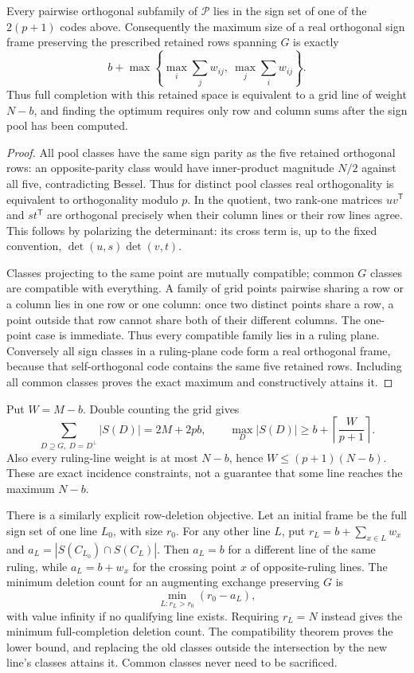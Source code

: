 \begin{theorem}
Every pairwise orthogonal subfamily of $\mathcal P$ lies in the
sign set of one of the $2(p+1)$ codes above. Consequently the maximum
size of a real orthogonal sign frame preserving the prescribed
retained rows spanning $G$ is exactly
\[
 \boxed{b+\max\left\{\max_i\sum_jw_{ij},\ \max_j\sum_iw_{ij}\right\}.}
\]
Thus full completion with this retained space is equivalent to a
grid line of weight $N-b$, and finding the optimum requires only
row and column sums after the sign pool has been computed.
\end{theorem}
\begin{proof}
All pool classes have the same sign parity as the five retained
orthogonal rows: an opposite-parity class would have inner-product
magnitude $N/2$ against all five, contradicting Bessel. Thus for
distinct pool classes real orthogonality is equivalent to orthogonality
modulo $p$. In the quotient, two rank-one matrices $uv^{\mathsf T}$
and $st^{\mathsf T}$ are orthogonal precisely when their column
lines or their row lines agree. This follows by polarizing the
determinant: its cross term is, up to the fixed convention,
$\det(u,s)\det(v,t)$.

Classes projecting to the same point are mutually compatible;
common $G$ classes are compatible with everything. A family of grid
points pairwise sharing a row or a column lies in one row or one
column: once two distinct points share a row, a point outside that
row cannot share both of their different columns. The one-point
case is immediate. Thus every compatible family lies in a ruling
plane. Conversely all sign classes in a ruling-plane code form
a real orthogonal frame, because that self-orthogonal code contains
the same five retained rows. Including all common classes proves
the exact maximum and constructively attains it.
\end{proof}

Put $W=M-b$. Double counting the grid gives
\[
 \sum_{D\supseteq G,\ D=D^\perp}|S(D)|=2M+2pb,
 \qquad
 \max_D|S(D)|\ge b+\left\lceil\frac{W}{p+1}\right\rceil.
\]
Also every ruling-line weight is at most $N-b$, hence
$W\le(p+1)(N-b)$. These are exact incidence constraints, not a
guarantee that some line reaches the maximum $N-b$.

There is a similarly explicit row-deletion objective. Let an initial
frame be the full sign set of one line $L_0$, with size $r_0$.
For any other line $L$, put $r_L=b+\sum_{x\in L}w_x$ and
$a_L=|S(C_{L_0})\cap S(C_L)|$. Then $a_L=b$ for a different line
of the same ruling, while $a_L=b+w_x$ for the crossing point $x$
of opposite-ruling lines. The minimum deletion count for an
augmenting exchange preserving $G$ is
\[
 \min_{L:r_L>r_0}(r_0-a_L),
\]
with value infinity if no qualifying line exists. Requiring
$r_L=N$ instead gives the minimum full-completion deletion count.
The compatibility theorem proves the lower bound, and replacing
the old classes outside the intersection by the new line's classes
attains it. Common classes never need to be sacrificed.

